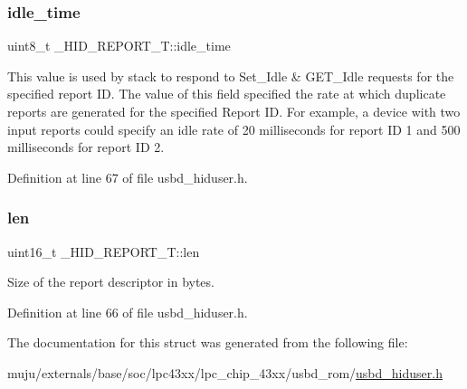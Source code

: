 \subsubsection{\texorpdfstring{idle\+\_\+time}{idle\_time}}
{\footnotesize\ttfamily uint8\+\_\+t \+\_\+\+H\+I\+D\+\_\+\+R\+E\+P\+O\+R\+T\+\_\+\+T\+::idle\+\_\+time}

This value is used by stack to respond to Set\+\_\+\+Idle \& G\+E\+T\+\_\+\+Idle requests for the specified report ID. The value of this field specified the rate at which duplicate reports are generated for the specified Report ID. For example, a device with two input reports could specify an idle rate of 20 milliseconds for report ID 1 and 500 milliseconds for report ID 2. 

Definition at line 67 of file usbd\+\_\+hiduser.\+h.

\mbox{\label{struct___h_i_d___r_e_p_o_r_t___t_a4c0e68b7360c08788605db4eb667cb4e}} 
\subsubsection{\texorpdfstring{len}{len}}
{\footnotesize\ttfamily uint16\+\_\+t \+\_\+\+H\+I\+D\+\_\+\+R\+E\+P\+O\+R\+T\+\_\+\+T\+::len}

Size of the report descriptor in bytes. 

Definition at line 66 of file usbd\+\_\+hiduser.\+h.



The documentation for this struct was generated from the following file\+:\begin{DoxyCompactItemize}
\item 
muju/externals/base/soc/lpc43xx/lpc\+\_\+chip\+\_\+43xx/usbd\+\_\+rom/\hyperlink{usbd__hiduser_8h}{usbd\+\_\+hiduser.\+h}\end{DoxyCompactItemize}
